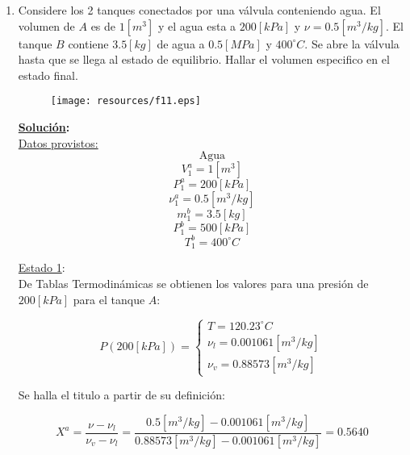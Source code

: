 \documentclass[letter,11pt]{article}
\begin{document}
\begin{enumerate}
\item Considere los 2 tanques conectados por una válvula conteniendo agua. El
volumen de $A$ es de $1[m^3]$ y el agua esta a $200[kPa]$ y $\nu=0.5[m^3/kg]$.
El tanque $B$ contiene $3.5[kg]$ de agua a $0.5[MPa]$ y $400^\circ C$. Se abre
la válvula hasta que se llega al estado de equilibrio. Hallar el volumen
especifico en el estado final.

\begin{figure}[H]
\centering
\texttt{[image: resources/f11.eps]}
\end{figure}

\textbf{\underline{Solución}:} \\

\underline{Datos provistos:}
\begin{equation*}
    \text{Agua}
\end{equation*}
\begin{equation*}
    V_1^a = 1[m^3]
\end{equation*}
\begin{equation*}
    P_1^a = 200[kPa]
\end{equation*}
\begin{equation*}
    \nu_1^a = 0.5[m^3/kg]
\end{equation*}
\begin{equation*}
    m_1^b = 3.5[kg]
\end{equation*}
\begin{equation*}
    P_1^b = 500[kPa]
\end{equation*}
\begin{equation*}
    T_1^b = 400^\circ C
\end{equation*}

\underline{Estado 1}: \\
De Tablas Termodinámicas se obtienen los valores para una presión de
$200[kPa]$ para el tanque $A$:

\begin{equation*}
    P(200[kPa]) = \begin{cases}
        T = 120.23^\circ C \\
        \nu_l = 0.001061[m^3/kg] \\
        \nu_v = 0.88573[m^3/kg]
    \end{cases}
\end{equation*}

Se halla el titulo a partir de su definición:

\begin{equation*}
    X^a = \frac{\nu-\nu_l}{\nu_v-\nu_l}
        = \frac{0.5[m^3/kg] - 0.001061[m^3/kg]}
          {0.88573[m^3/kg] - 0.001061[m^3/kg]}
        = 0.5640
\end{equation*}


\end{enumerate}
\end{document}
